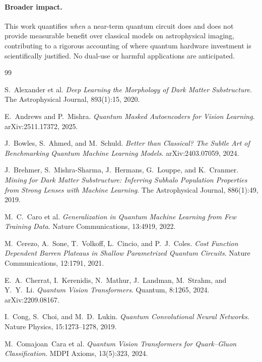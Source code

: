 \documentclass[10pt,letterpaper]{article}
\theoremstyle{plain}
\theoremstyle{definition}
\begin{document}
\paragraph{Broader impact.}
This work quantifies \emph{when} a near-term quantum circuit does and does not
provide measurable benefit over classical models on astrophysical imaging,
contributing to a rigorous accounting of where quantum hardware investment is
scientifically justified. No dual-use or harmful applications are anticipated.


\begin{thebibliography}{99}

S.~Alexander et al.
\textit{Deep Learning the Morphology of Dark Matter Substructure}.
The Astrophysical Journal, 893(1):15, 2020.

E.~Andrews and P.~Mishra.
\textit{Quantum Masked Autoencoders for Vision Learning}.
arXiv:2511.17372, 2025.

J.~Bowles, S.~Ahmed, and M.~Schuld.
\textit{Better than Classical? The Subtle Art of Benchmarking Quantum Machine
Learning Models}.
arXiv:2403.07059, 2024.

J.~Brehmer, S.~Mishra-Sharma, J.~Hermans, G.~Louppe, and K.~Cranmer.
\textit{Mining for Dark Matter Substructure: Inferring Subhalo Population
Properties from Strong Lenses with Machine Learning}.
The Astrophysical Journal, 886(1):49, 2019.

M.~C.~Caro et al.
\textit{Generalization in Quantum Machine Learning from Few Training Data}.
Nature Communications, 13:4919, 2022.

M.~Cerezo, A.~Sone, T.~Volkoff, L.~Cincio, and P.~J.~Coles.
\textit{Cost Function Dependent Barren Plateaus in Shallow Parametrized Quantum
Circuits}.
Nature Communications, 12:1791, 2021.

E.~A.~Cherrat, I.~Kerenidis, N.~Mathur, J.~Landman, M.~Strahm, and Y.~Y.~Li.
\textit{Quantum Vision Transformers}.
Quantum, 8:1265, 2024. arXiv:2209.08167.

I.~Cong, S.~Choi, and M.~D.~Lukin.
\textit{Quantum Convolutional Neural Networks}.
Nature Physics, 15:1273--1278, 2019.

M.~Comajoan~Cara et al.
\textit{Quantum Vision Transformers for Quark--Gluon Classification}.
MDPI Axioms, 13(5):323, 2024.


\end{thebibliography}
\end{document}
